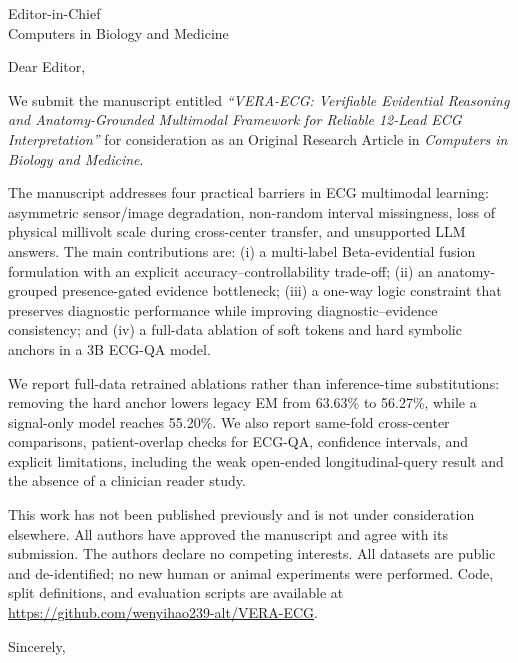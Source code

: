 ﻿\documentclass[11pt]{letter}
\begin{document}
\begin{letter}{Editor-in-Chief\\Computers in Biology and Medicine}

\opening{Dear Editor,}

We submit the manuscript entitled \textit{``VERA-ECG: Verifiable Evidential Reasoning and Anatomy-Grounded Multimodal Framework for Reliable 12-Lead ECG Interpretation''} for consideration as an Original Research Article in \textit{Computers in Biology and Medicine}.

The manuscript addresses four practical barriers in ECG multimodal learning: asymmetric sensor/image degradation, non-random interval missingness, loss of physical millivolt scale during cross-center transfer, and unsupported LLM answers. The main contributions are: (i) a multi-label Beta-evidential fusion formulation with an explicit accuracy--controllability trade-off; (ii) an anatomy-grouped presence-gated evidence bottleneck; (iii) a one-way logic constraint that preserves diagnostic performance while improving diagnostic--evidence consistency; and (iv) a full-data ablation of soft tokens and hard symbolic anchors in a 3B ECG-QA model.

We report full-data retrained ablations rather than inference-time substitutions: removing the hard anchor lowers legacy EM from 63.63\% to 56.27\%, while a signal-only model reaches 55.20\%. We also report same-fold cross-center comparisons, patient-overlap checks for ECG-QA, confidence intervals, and explicit limitations, including the weak open-ended longitudinal-query result and the absence of a clinician reader study.

This work has not been published previously and is not under consideration elsewhere. All authors have approved the manuscript and agree with its submission. The authors declare no competing interests. All datasets are public and de-identified; no new human or animal experiments were performed. Code, split definitions, and evaluation scripts are available at \url{https://github.com/wenyihao239-alt/VERA-ECG}.

\closing{Sincerely,}

\end{letter}
\end{document}
